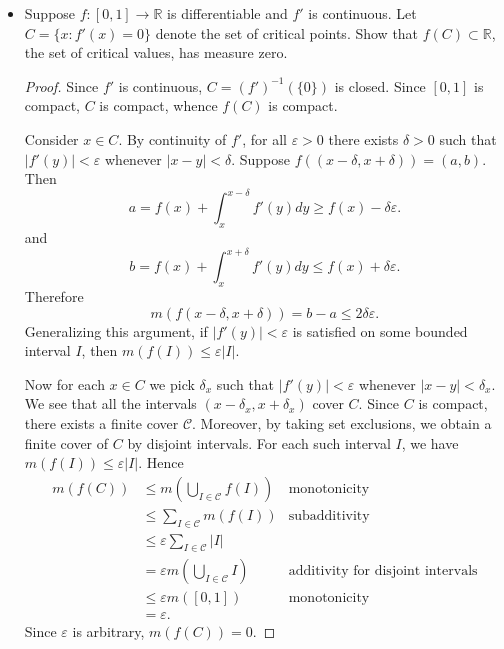 \begin{itemize}
\begin{proof}
	Finally we verify that $E$ has measure zero. To prove this, we simply let $(I_n)_{n \in \mathbb{N}}$ be a countable cover of $\mathbb{R}$ by finite intervals. Now for each $n \in \mathbb{N}$, let $\mathcal{C}_n$ be a countable cover of $E \cap I_n$ by intervals whose sum of length is less than $\frac{\varepsilon}{2^n}$. Now $\mathcal{C} := \bigcup_{n \in \mathbb{N}} \mathcal{C}_n$ is a countable cover of $E \cap \mathbb{R} = E$ and 
	\[
		\sum_{J \in \mathcal{C}}|J| = \sum_{n \in \mathbb{N}} \sum_{J \in \mathcal{C}_n}|J| < \sum_{n \in \mathbb{N}} \frac{\varepsilon}{2^n} = 2 \varepsilon
	.\] 
	This shows that $E$ has zero measure.
\end{proof}

\item Suppose $f: [0,1] \to \mathbb{R}$ is differentiable and $f'$ is continuous. Let $C = \{x : f'(x) = 0\} $ denote the set of critical points. Show that $f(C) \subset \mathbb{R}$, the set of critical values, has measure zero.
\begin{proof}
	Since $f'$ is continuous, $C = \left( f' \right) ^{-1}\left( \{0\}  \right) $ is closed. Since $[0,1]$ is compact, $C$ is compact, whence $f(C)$ is compact.

	Consider $x \in C$. By continuity of $f'$, for all $\varepsilon>0$ there exists $\delta>0$ such that $\left| f'(y) \right| <\varepsilon$ whenever $\left| x - y \right| < \delta$. Suppose $f\left( (x-\delta, x+\delta) \right)  = (a,b)$. Then
	\[
		a = f(x) + \int _x^{x-\delta} f'(y) dy \ge f(x) - \delta \varepsilon
	.\] 
	and
	\[
		b = f(x) + \int _x^{x + \delta}f'(y) dy \le  f(x) + \delta \varepsilon
	.\]
	Therefore
	\[
		m\left( f (x - \delta, x+\delta) \right) 
		= b - a \le 2 \delta \varepsilon
	.\] 
	Generalizing this argument, if $|f'(y)| < \varepsilon$ is satisfied on some bounded interval $I$, then $m(f(I)) \le \varepsilon |I|$.
	
	Now for each $x \in C$ we pick  $\delta_x$ such that $|f'(y)|< \varepsilon$ whenever $|x - y| < \delta_x$. We see that all the intervals $(x - \delta_x, x+\delta_x)$ cover $C$. Since $C$ is compact, there exists a finite cover $\mathcal{C}$. Moreover, by taking set exclusions, we obtain a finite cover of $C$ by disjoint intervals. For each such interval $I$, we have $m(f(I)) \le \varepsilon |I|$. Hence
	\begin{align*}
		m(f(C)) 
									    &\le m\left(\bigcup_{I \in \mathcal{C}} f(I) \right)  & \text{monotonicity}\\
									    &\le  \sum_{I \in \mathcal{C}} m\left( f(I) \right)  &\text{subadditivity}\\
		&\le \varepsilon \sum_{I \in \mathcal{C}} |I| \\
		&= \varepsilon m\left( \bigcup_{I \in \mathcal{C}} I \right)  &\text{additivity for disjoint intervals}\\
		&\le \varepsilon m\left( [0,1] \right) & \text{monotonicity} \\
		&= \varepsilon
	.\end{align*} 
	Since $\varepsilon$ is arbitrary, $m(f(C)) = 0$.
\end{proof}


\end{itemize}
